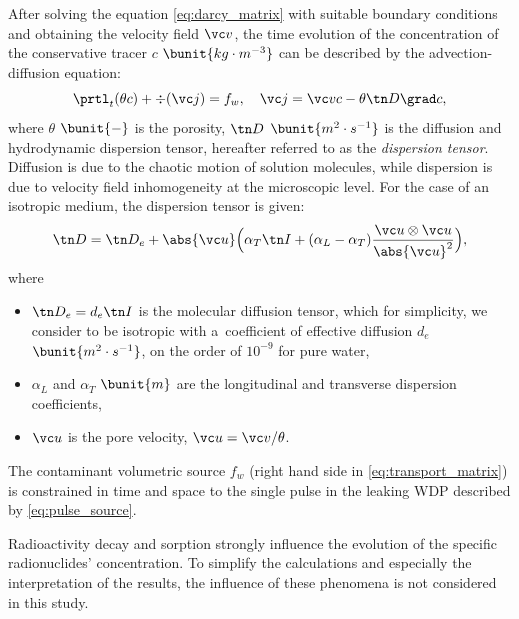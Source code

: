 After solving the equation \eqref{eq:darcy_matrix} with suitable boundary conditions and obtaining the velocity field $\vc v$, the time evolution of the concentration of the conservative tracer $c$ $\bunit{kg\cdot m^{-3}}$ can be described by the advection-diffusion equation:
\begin{equation}
   \label{eq:transport_matrix}
   \prtl_t (\theta c) + \div(\vc j) = f_w,\quad \vc j = \vc v c - \theta \tn D \grad c,
\end{equation}
where $\theta$ $\bunit{-}$ is the porosity, $\tn D$ $\bunit{m^2\cdot s^{-1}}$ is the diffusion and hydrodynamic dispersion tensor, hereafter referred to as the {\it dispersion tensor}. Diffusion is due to the chaotic motion of solution molecules, while dispersion is due to velocity field inhomogeneity at the microscopic level.
For the case of an isotropic medium, the dispersion tensor is given:
\begin{equation}
  \label{eq:dispersion_tn}
  \tn D = \tn D_e + \abs{\vc u}\Big(\alpha_T \tn I + (\alpha_L - \alpha_T)\frac{\vc u \otimes \vc u}{\abs{\vc u}^2}\Big),
\end{equation}
where
\begin{itemize}
 \item $\tn D_e = d_e \tn I$ is the molecular diffusion tensor, which for simplicity, we consider to be isotropic with a~coefficient of effective diffusion $d_e$ $\bunit{m^2\cdot s^{-1}}$, on the order of $10^{-9}$ for pure water,
 \item $\alpha_L$ and $\alpha_T$ $\bunit{m}$ are the longitudinal and transverse dispersion coefficients,
 \item $\vc u$ is the pore velocity, $\vc u = \vc v / \theta$.
\end{itemize}

The contaminant volumetric source $f_w$ (right hand side in \eqref{eq:transport_matrix}) is constrained in time and space to the single pulse in the leaking  \gls{WDP} described by  \eqref{eq:pulse_source}.

Radioactivity decay and sorption strongly influence the evolution of the specific radionuclides' concentration. To simplify the calculations and especially the interpretation of the results, the influence of these phenomena is not considered in this study.


